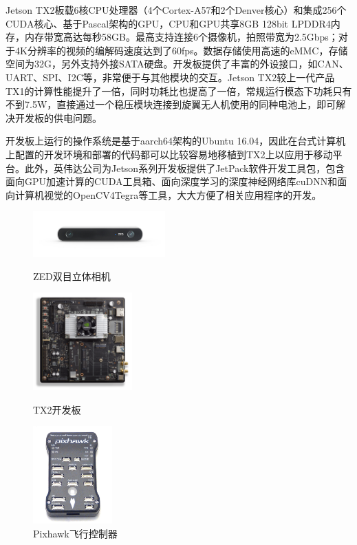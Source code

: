 Jetson TX2板载6核CPU处理器（4个Cortex-A57和2个Denver核心）和集成256个CUDA核心、基于Pascal架构的GPU，CPU和GPU共享8GB 128bit LPDDR4内存，内存带宽高达每秒58GB。最高支持连接6个摄像机，拍照带宽为2.5Gbps；对于4K分辨率的视频的编解码速度达到了60fps。数据存储使用高速的eMMC，存储空间为32G，另外支持外接SATA硬盘。开发板提供了丰富的外设接口，如CAN、UART、SPI、I2C等，非常便于与其他模块的交互。Jetson TX2较上一代产品TX1的计算性能提升了一倍，同时功耗比也提高了一倍，常规运行模态下功耗只有不到7.5W，直接通过一个稳压模块连接到旋翼无人机使用的同种电池上，即可解决开发板的供电问题。

开发板上运行的操作系统是基于aarch64架构的Ubuntu 16.04，因此在台式计算机上配置的开发环境和部署的代码都可以比较容易地移植到TX2上以应用于移动平台。此外，英伟达公司为Jetson系列开发板提供了JetPack软件开发工具包，包含面向GPU加速计算的CUDA工具箱、面向深度学习的深度神经网络库cuDNN和面向计算机视觉的OpenCV4Tegra等工具，大大方便了相关应用程序的开发。

\begin{figure}[htbp]
	\centering
	\begin{minipage}[c]{0.3\textwidth}
		\centering
		\includegraphics[width=2in]{figures/5_平台介绍/ZED}
		\caption{ZED双目立体相机}
	\end{minipage}
	\hfill
	\begin{minipage}[c]{0.3\textwidth}
		\centering
		\includegraphics[width=1.5in]{figures/5_平台介绍/TX2}
		\caption{TX2开发板}
	\end{minipage}
	\begin{minipage}[c]{0.3\textwidth}
		\centering
		\includegraphics[width=1.2in]{figures/5_平台介绍/pixhawk}
		\caption{Pixhawk飞行控制器}
	\end{minipage}
\end{figure}

